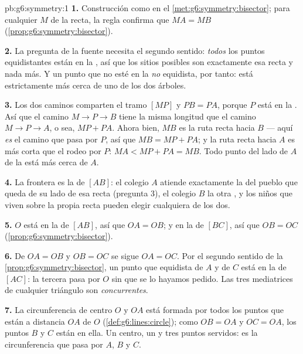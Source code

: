 \begin{solution}{pb:g6:symmetry:1}
\textbf{1.} Construcción como en el \cref{met:g6:symmetry:bisector};
para cualquier $M$ de la recta, la regla confirma que $MA = MB$
(\cref{prop:g6:symmetry:bisector}).

\textbf{2.} La pregunta de la fuente necesita el segundo sentido:
\emph{todos} los puntos equidistantes están en la , así que los
sitios posibles son exactamente esa recta y nada más. Y un
punto que no esté en la  \emph{no} equidista, por tanto:
está estrictamente más cerca de uno de los dos árboles.

\textbf{3.} Los dos caminos comparten el tramo $[MP]$ y $PB = PA$,
porque $P$ está en la . Así que el camino $M \to P \to B$ tiene
la misma longitud que el camino $M \to P \to A$, o sea, $MP + PA$.
Ahora bien, $MB$ es la ruta recta hacia $B$ --- aquí \emph{es} el
camino que pasa por $P$, así que $MB = MP + PA$; y la ruta recta hacia
$A$ es más corta que el rodeo por $P$: $MA < MP + PA = MB$.
Todo punto del lado de $A$ de la  está más cerca de $A$.

\textbf{4.} La frontera es la  de $[AB]$:
el colegio $A$ atiende exactamente la  del pueblo que queda de su lado de
esa recta (pregunta 3), el colegio $B$ la otra , y los niños
que viven sobre la propia recta pueden elegir cualquiera de los dos.

\textbf{5.} $O$ está en la  de $[AB]$, así que $OA = OB$;
y en la de $[BC]$, así que $OB = OC$
(\cref{prop:g6:symmetry:bisector}).

\textbf{6.} De $OA = OB$ y $OB = OC$ se sigue $OA = OC$. Por el
segundo sentido de la \cref{prop:g6:symmetry:bisector}, un punto que
equidista de $A$ y de $C$ está en la 
de $[AC]$: la tercera  pasa por $O$ sin que se lo
hayamos pedido. Las tres mediatrices de cualquier triángulo son
\emph{concurrentes}.

\textbf{7.} La circunferencia de centro $O$ y  $OA$ está formada por
todos los puntos que están a distancia $OA$ de $O$
(\cref{def:g6:lines:circle}); como $OB = OA$ y $OC = OA$, los
puntos $B$ y $C$ están en ella. Un centro, un  y tres
puntos servidos: es la circunferencia que pasa por $A$, $B$ y $C$.


\end{solution}
